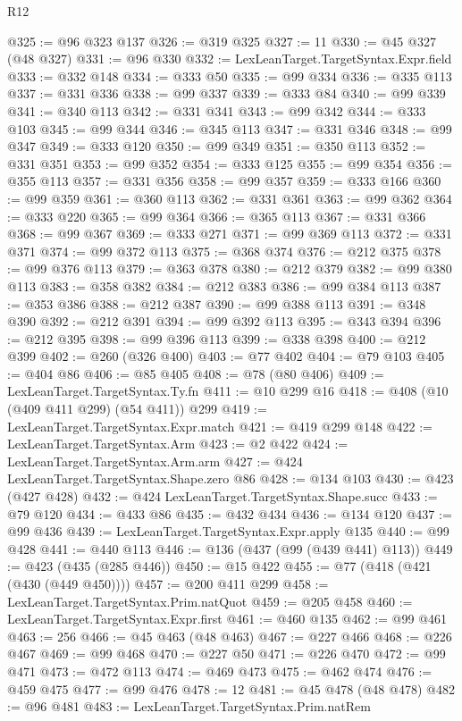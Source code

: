 \begin{lexlean}{R12}
\begin{coremodule}
{{{{{{{{{{{{{{{{{{{{{{{{{{{{{{{{{{{{{{{{{{{{{{{{{{{{{{{{{{{{{{{{{{{{{{{{{{{{{{{{{{{{{{{{{{{{{{{{{{{{{{{{{{@325 := @96 @323 @137
@326 := @319 @325
@327 := 11
@330 := @45 @327 (@48 @327)
@331 := @96 @330
@332 := LexLeanTarget.TargetSyntax.Expr.field
@333 := @332 @148
@334 := @333 @50
@335 := @99 @334
@336 := @335 @113
@337 := @331 @336
@338 := @99 @337
@339 := @333 @84
@340 := @99 @339
@341 := @340 @113
@342 := @331 @341
@343 := @99 @342
@344 := @333 @103
@345 := @99 @344
@346 := @345 @113
@347 := @331 @346
@348 := @99 @347
@349 := @333 @120
@350 := @99 @349
@351 := @350 @113
@352 := @331 @351
@353 := @99 @352
@354 := @333 @125
@355 := @99 @354
@356 := @355 @113
@357 := @331 @356
@358 := @99 @357
@359 := @333 @166
@360 := @99 @359
@361 := @360 @113
@362 := @331 @361
@363 := @99 @362
@364 := @333 @220
@365 := @99 @364
@366 := @365 @113
@367 := @331 @366
@368 := @99 @367
@369 := @333 @271
@371 := @99 @369 @113
@372 := @331 @371
@374 := @99 @372 @113
@375 := @368 @374
@376 := @212 @375
@378 := @99 @376 @113
@379 := @363 @378
@380 := @212 @379
@382 := @99 @380 @113
@383 := @358 @382
@384 := @212 @383
@386 := @99 @384 @113
@387 := @353 @386
@388 := @212 @387
@390 := @99 @388 @113
@391 := @348 @390
@392 := @212 @391
@394 := @99 @392 @113
@395 := @343 @394
@396 := @212 @395
@398 := @99 @396 @113
@399 := @338 @398
@400 := @212 @399
@402 := @260 (@326 @400)
@403 := @77 @402
@404 := @79 @103
@405 := @404 @86
@406 := @85 @405
@408 := @78 (@80 @406)
@409 := LexLeanTarget.TargetSyntax.Ty.fn
@411 := @10 @299 @16
@418 := @408 (@10 (@409 @411 @299) (@54 @411)) @299
@419 := LexLeanTarget.TargetSyntax.Expr.match
@421 := @419 @299 @148
@422 := LexLeanTarget.TargetSyntax.Arm
@423 := @2 @422
@424 := LexLeanTarget.TargetSyntax.Arm.arm
@427 := @424 LexLeanTarget.TargetSyntax.Shape.zero @86
@428 := @134 @103
@430 := @423 (@427 @428)
@432 := @424 LexLeanTarget.TargetSyntax.Shape.succ
@433 := @79 @120
@434 := @433 @86
@435 := @432 @434
@436 := @134 @120
@437 := @99 @436
@439 := LexLeanTarget.TargetSyntax.Expr.apply @135
@440 := @99 @428
@441 := @440 @113
@446 := @136 (@437 (@99 (@439 @441) @113))
@449 := @423 (@435 (@285 @446))
@450 := @15 @422
@455 := @77 (@418 (@421 (@430 (@449 @450))))
@457 := @200 @411 @299
@458 := LexLeanTarget.TargetSyntax.Prim.natQuot
@459 := @205 @458
@460 := LexLeanTarget.TargetSyntax.Expr.first
@461 := @460 @135
@462 := @99 @461
@463 := 256
@466 := @45 @463 (@48 @463)
@467 := @227 @466
@468 := @226 @467
@469 := @99 @468
@470 := @227 @50
@471 := @226 @470
@472 := @99 @471
@473 := @472 @113
@474 := @469 @473
@475 := @462 @474
@476 := @459 @475
@477 := @99 @476
@478 := 12
@481 := @45 @478 (@48 @478)
@482 := @96 @481
@483 := LexLeanTarget.TargetSyntax.Prim.natRem
}}}}}}}}}}}}}}}}}}}}}}}}}}}}}}}}}}}}}}}}}}}}}}}}}}}}}}}}}}}}}}}}}}}}}}}}}}}}}}}}}}}}}}}}}}}}}}}}}}}}}}}}}}
\end{coremodule}
\end{lexlean}
